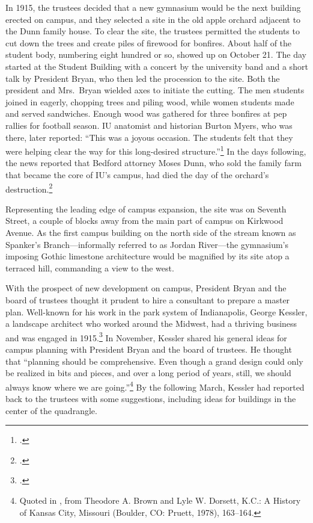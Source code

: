 \documentclass[
  american,
  letterpaper,
]{scrreprt}
\begin{document}
In 1915, the trustees decided that a new gymnasium would be the next
building erected on campus, and they selected a site in the old apple
orchard adjacent to the Dunn family house. To clear the site, the
trustees permitted the students to cut down the trees and create piles
of firewood for bonfires. About half of the student body, numbering
eight hundred or so, showed up on October 21. The day started at the
Student Building with a concert by the university band and a short talk
by President Bryan, who then led the procession to the site. Both the
president and Mrs.~Bryan wielded axes to initiate the cutting. The men
students joined in eagerly, chopping trees and piling wood, while women
students made and served sandwiches. Enough wood was gathered for three
bonfires at pep rallies for football season. IU anatomist and historian
Burton Myers, who was there, later reported: ``This was a joyous
occasion. The students felt that they were helping clear the way for
this long-desired structure.''\footnote{.} In the days
following, the news reported that Bedford attorney Moses Dunn, who sold
the family farm that became the core of IU's campus, had died the day of
the orchard's destruction.\footnote{.}

Representing the leading edge of campus expansion, the site was on
Seventh Street, a couple of blocks away from the main part of campus on
Kirkwood Avenue. As the first campus building on the north side of the
stream known as Spanker's Branch---informally referred to as Jordan
River---the gymnasium's imposing Gothic limestone architecture would be
magnified by its site atop a terraced hill, commanding a view to the
west.

With the prospect of new development on campus, President Bryan and the
board of trustees thought it prudent to hire a consultant to prepare a
master plan. Well-known for his work in the park system of Indianapolis,
George Kessler, a landscape architect who worked around the Midwest, had
a thriving business and was engaged in 1915.\footnote{.} In November,
Kessler shared his general ideas for campus planning with President
Bryan and the board of trustees. He thought that ``planning should be
comprehensive. Even though a grand design could only be realized in bits
and pieces, and over a long period of years, still, we should always
know where we are going.''\footnote{Quoted in
  , from Theodore A. Brown and Lyle W. Dorsett, K.C.: A
  History of Kansas City, Missouri (Boulder, CO: Pruett, 1978),
  163--164.} By the following March, Kessler had reported back to the
trustees with some suggestions, including ideas for buildings in the
center of the quadrangle.
\end{document}
